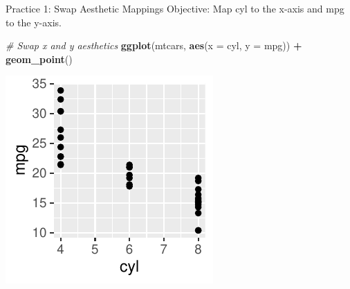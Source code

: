 \documentclass[
  ignorenonframetext,
]{beamer}
\newenvironment{Shaded}{\begin{snugshade}}{\end{snugshade}}
\newcommand{\AttributeTok}[1]{\textcolor[rgb]{0.13,0.29,0.53}{#1}}
\newcommand{\CommentTok}[1]{\textcolor[rgb]{0.56,0.35,0.01}{\textit{#1}}}
\newcommand{\FunctionTok}[1]{\textcolor[rgb]{0.13,0.29,0.53}{\textbf{#1}}}
\newcommand{\NormalTok}[1]{#1}
\newcommand{\SpecialCharTok}[1]{\textcolor[rgb]{0.81,0.36,0.00}{\textbf{#1}}}
\begin{document}
\begin{frame}[fragile]{Practice 1: Swap Aesthetic Mappings}
\label{practice-1-swap-aesthetic-mappings}
Objective: Map cyl to the x-axis and mpg to the y-axis.


\begin{Shaded}
\begin{Highlighting}[]
\CommentTok{\# Swap x and y aesthetics}
\FunctionTok{ggplot}\NormalTok{(mtcars, }\FunctionTok{aes}\NormalTok{(}\AttributeTok{x =}\NormalTok{ cyl, }\AttributeTok{y =}\NormalTok{ mpg)) }\SpecialCharTok{+} \FunctionTok{geom\_point}\NormalTok{()}
\end{Highlighting}
\end{Shaded}

\begin{center}\includegraphics[width=0.5\linewidth]{Figs/unnamed-chunk-11-1} \end{center}
\end{frame}
\end{document}
